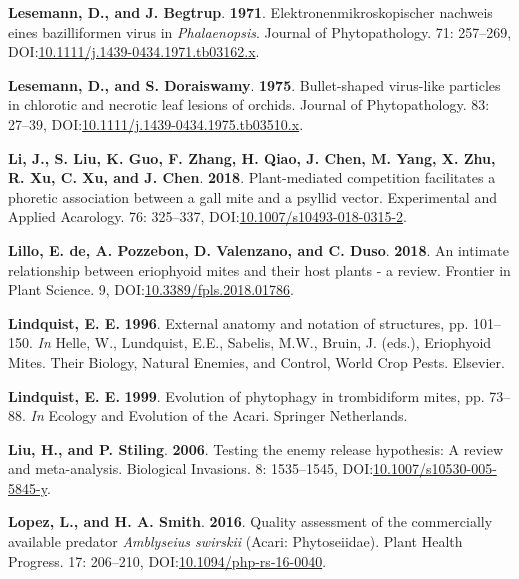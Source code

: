 \documentclass[12pt,final,CPage]{ufthesis}
\newlength{\cslhangindent}
\newenvironment{CSLReferences}[2] %
{%
	\setlength{\parindent}{0pt}
	\ifodd #1 \everypar{\setlength{\hangindent}{\cslhangindent}}\ignorespaces\fi
	\ifnum #2 > 0
	\setlength{\parskip}{#2\baselineskip}
	\fi
}%
{}
\begin{document}
{\begin{CSLReferences}{1}{0}
  \leavevmode{}%
  \textbf{Lesemann, D., and J. Begtrup}. \textbf{1971}. Elektronenmikroskopischer nachweis eines bazilliformen virus in {\emph{Phalaenopsis}}. Journal of Phytopathology. 71: 257--269, DOI:\href{https://doi.org/10.1111/j.1439-0434.1971.tb03162.x}{10.1111/j.1439-0434.1971.tb03162.x}.

  \leavevmode{}%
  \textbf{Lesemann, D., and S. Doraiswamy}. \textbf{1975}. Bullet-shaped virus-like particles in chlorotic and necrotic leaf lesions of orchids. Journal of Phytopathology. 83: 27--39, DOI:\href{https://doi.org/10.1111/j.1439-0434.1975.tb03510.x}{10.1111/j.1439-0434.1975.tb03510.x}.

  \leavevmode{}%
  \textbf{Li, J., S. Liu, K. Guo, F. Zhang, H. Qiao, J. Chen, M. Yang, X. Zhu, R. Xu, C. Xu, and J. Chen}. \textbf{2018}. Plant-mediated competition facilitates a phoretic association between a gall mite and a psyllid vector. Experimental and Applied Acarology. 76: 325--337, DOI:\href{https://doi.org/10.1007/s10493-018-0315-2}{10.1007/s10493-018-0315-2}.

  \leavevmode{}%
  \textbf{Lillo, E. de, A. Pozzebon, D. Valenzano, and C. Duso}. \textbf{2018}. An intimate relationship between eriophyoid mites and their host plants - a review. Frontier in Plant Science. 9, DOI:\href{https://doi.org/10.3389/fpls.2018.01786}{10.3389/fpls.2018.01786}.

  \leavevmode{}%
  \textbf{Lindquist, E. E.} \textbf{1996}. External anatomy and notation of structures, pp. 101--150. \emph{In} Helle, W., Lundquist, E.E., Sabelis, M.W., Bruin, J. (eds.), Eriophyoid Mites. Their Biology, Natural Enemies, and Control, World Crop Pests. Elsevier.

  \leavevmode{}%
  \textbf{Lindquist, E. E.} \textbf{1999}. Evolution of phytophagy in trombidiform mites, pp. 73--88. \emph{In} Ecology and Evolution of the Acari. Springer Netherlands.

  \leavevmode{}%
  \textbf{Liu, H., and P. Stiling}. \textbf{2006}. Testing the enemy release hypothesis: A review and meta-analysis. Biological Invasions. 8: 1535--1545, DOI:\href{https://doi.org/10.1007/s10530-005-5845-y}{10.1007/s10530-005-5845-y}.

  \leavevmode{}%
  \textbf{Lopez, L., and H. A. Smith}. \textbf{2016}. Quality assessment of the commercially available predator {\emph{Amblyseius swirskii}} ({Acari}: {Phytoseiidae}). Plant Health Progress. 17: 206--210, DOI:\href{https://doi.org/10.1094/php-rs-16-0040}{10.1094/php-rs-16-0040}.


\end{CSLReferences}}
\end{document}
